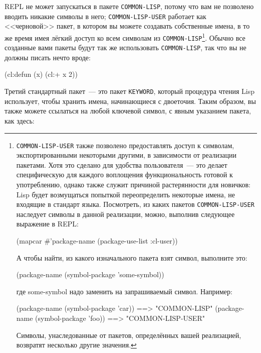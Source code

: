 REPL не может запускаться в пакете \lstinline{COMMON-LISP}, потому что вам не позволено вводить
никакие символы в него; \lstinline{COMMON-LISP-USER} работает как <<черновой>> пакет, в котором вы
можете создавать собственные имена, в то же время имея лёгкий доступ ко всем символам из
\lstinline{COMMON-LISP}\footnote{\lstinline{COMMON-LISP-USER} также позволено предоставлять доступ
  к символам, экспортированными некоторыми другими, в зависимости от реализации
  пакетами. Хотя это сделано для удобства пользователя~--- это делает специфическую для
  каждого воплощения функциональность готовой к употреблению, однако также служит
  причиной растерянности для новичков: Lisp будет возмущаться попыткой переопределить
  некоторые имена, не входящие в стандарт языка. Посмотреть, из каких пакетов
  \lstinline{COMMON-LISP-USER} наследует символы в данной реализации, можно, выполнив следующее
  выражение в REPL:

\begin{myverb}
(mapcar #'package-name (package-use-list :cl-user))
\end{myverb}

А чтобы найти, из какого изначального пакета взят символ, выполните это:

\begin{myverb}
(package-name (symbol-package 'some-symbol))
\end{myverb}

\noindent{}где some-symbol надо заменить на запрашиваемый символ. Например:

\begin{myverb}
(package-name (symbol-package 'car)) ==> "COMMON-LISP"
(package-name (symbol-package 'foo)) ==> "COMMON-LISP-USER"
\end{myverb}

Символы, унаследованные от пакетов, определённых вашей реализацией, возвратят несколько
другие значения.}\hspace{\footnotenegspace}. Обычно все созданные вами пакеты будут так же использовать
\lstinline{COMMON-LISP}, так что вы не должны писать нечто вроде:

\begin{myverb}
(cl:defun (x) (cl:+ x 2))
\end{myverb}

Третий стандартный пакет~--- это пакет \lstinline{KEYWORD}, который процедура чтения Lisp
использует, чтобы хранить имена, начинающиеся с двоеточия. Таким образом, вы также можете
ссылаться на любой ключевой символ, с явным указанием пакета, как здесь:

